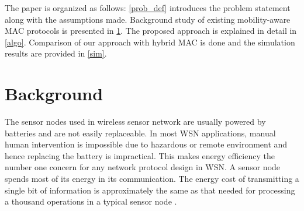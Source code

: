 \documentclass[a4paper, conference, 10pt]{IEEEtran}
\begin{document}



The paper is organized as follows: \ref{prob_def} introduces the problem statement along with the assumptions made. Background study of existing mobility-aware MAC protocols is presented in \ref{bg}. The proposed approach is explained in detail in \ref{algo}. Comparison of our approach with hybrid MAC\cite{hmac} is done and the simulation results are provided in \ref{sim}. 




\section{Background}
\label{bg}


The sensor nodes used in wireless sensor network are usually powered by batteries and are not easily replaceable. In most WSN applications, manual human intervention is impossible due to hazardous or remote environment and hence replacing the battery is impractical. This makes energy efficiency the number one concern for any network protocol design in WSN. A sensor node spends most of its energy in its communication. The energy cost of transmitting a single bit of information is approximately the same as that needed for processing a thousand operations in a typical sensor node \cite{eeff_q}. \\

\end{document}
